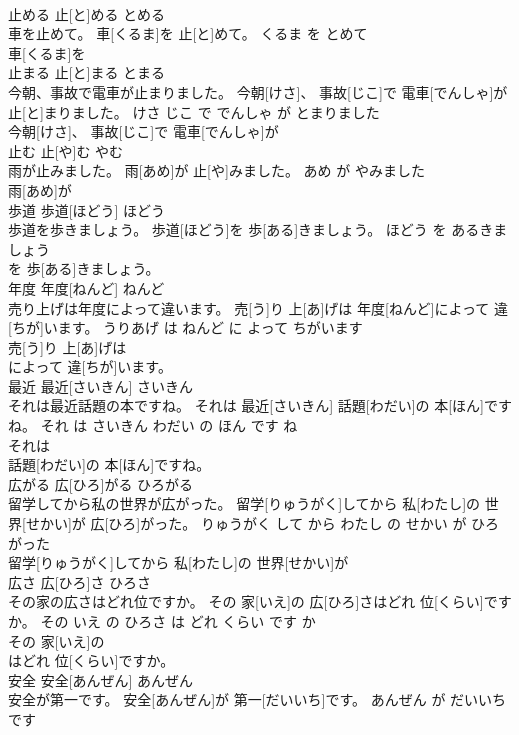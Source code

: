 \documentclass[8pt]{extreport}
\begin{document}
\begin{CJK}{UTF8}{min}
\\	止める	止[と]める	とめる	
\\	車を止めて。	車[くるま]を 止[と]めて。	くるま を とめて	
\\	車[くるま]を
\\	止まる	止[と]まる	とまる	
\\	今朝、事故で電車が止まりました。	今朝[けさ]、 事故[じこ]で 電車[でんしゃ]が 止[と]まりました。	けさ じこ で でんしゃ が とまりました	
\\	今朝[けさ]、 事故[じこ]で 電車[でんしゃ]が
\\	止む	止[や]む	やむ	
\\	雨が止みました。	雨[あめ]が 止[や]みました。	あめ が やみました	
\\	雨[あめ]が
\\	歩道	歩道[ほどう]	ほどう	
\\	歩道を歩きましょう。	歩道[ほどう]を 歩[ある]きましょう。	ほどう を あるきましょう	
\\	を 歩[ある]きましょう。			
\\	年度	年度[ねんど]	ねんど	
\\	売り上げは年度によって違います。	売[う]り 上[あ]げは 年度[ねんど]によって 違[ちが]います。	うりあげ は ねんど に よって ちがいます	
\\	売[う]り 上[あ]げは
\\	によって 違[ちが]います。			
\\	最近	最近[さいきん]	さいきん	
\\	それは最近話題の本ですね。	それは 最近[さいきん] 話題[わだい]の 本[ほん]ですね。	それ は さいきん わだい の ほん です ね	
\\	それは
\\	話題[わだい]の 本[ほん]ですね。			
\\	広がる	広[ひろ]がる	ひろがる	
\\	留学してから私の世界が広がった。	留学[りゅうがく]してから 私[わたし]の 世界[せかい]が 広[ひろ]がった。	りゅうがく して から わたし の せかい が ひろがった	
\\	留学[りゅうがく]してから 私[わたし]の 世界[せかい]が
\\	広さ	広[ひろ]さ	ひろさ	
\\	その家の広さはどれ位ですか。	その 家[いえ]の 広[ひろ]さはどれ 位[くらい]ですか。	その いえ の ひろさ は どれ くらい です か	
\\	その 家[いえ]の
\\	はどれ 位[くらい]ですか。			
\\	安全	安全[あんぜん]	あんぜん	
\\	安全が第一です。	安全[あんぜん]が 第一[だいいち]です。	あんぜん が だいいち です	

\end{CJK}
\end{document}

